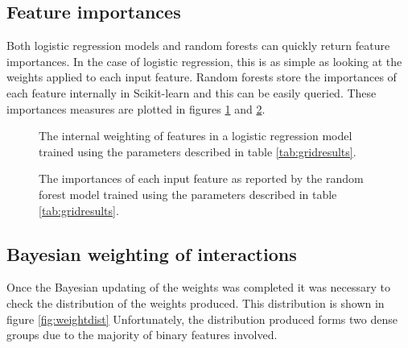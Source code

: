 \subsection{Feature importances}
\label{importances}

Both logistic regression models and random forests can quickly return feature importances.
In the case of logistic regression, this is as simple as looking at the weights applied to each input feature.
Random forests store the importances of each feature internally in Scikit-learn and this can be easily queried.
These importances measures are plotted in figures \ref{fig:logregweights} and \ref{fig:rfimportances}.

\begin{figure}
    \centering
    \setlength\figureheight{3in}
    \setlength\figurewidth{4in}
    \caption{The internal weighting of features in a logistic regression model trained using the parameters described in table \ref{tab:gridresults}.}
    \label{fig:logregweights}
\end{figure}

\begin{figure}
    \centering
    \setlength\figureheight{3in}
    \setlength\figurewidth{4in}
    \caption{The importances of each input feature as reported by the random forest model trained using the parameters described in table \ref{tab:gridresults}.}
    \label{fig:rfimportances}
\end{figure}

\subsection{Bayesian weighting of interactions}
\label{bayesresults}



Once the Bayesian updating of the weights was completed it was necessary to check the distribution of the weights produced.
This distribution is shown in figure \ref{fig:weightdist}
Unfortunately, the distribution produced forms two dense groups due to the majority of binary features involved.

